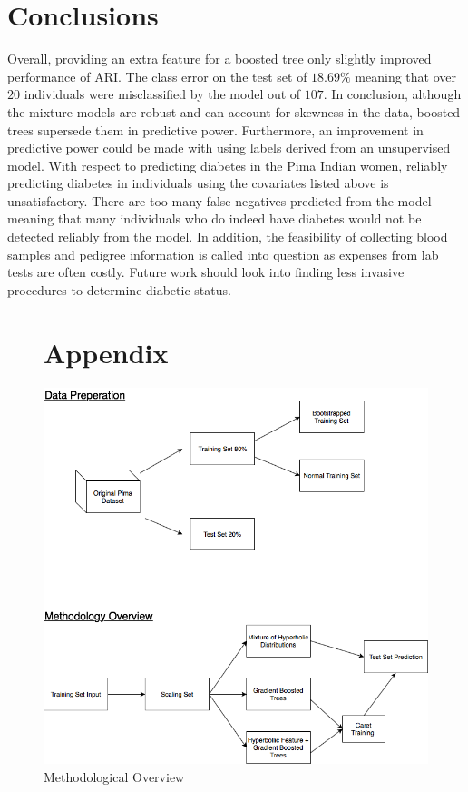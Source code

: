 \documentclass[11pt,letterpaper]{article}
\begin{document}
\section{Conclusions}
Overall, providing an extra feature for a boosted tree only slightly improved performance of ARI. The class error on the test set of  $18.69 \%$ meaning that over $20$ individuals were misclassified by the model out of $107$. In conclusion, although the mixture models are robust and can account for skewness in the data, boosted trees supersede them in predictive power. Furthermore, an improvement in predictive power could be made with using labels derived from an unsupervised model. With respect to predicting diabetes in the Pima Indian women, reliably predicting diabetes in individuals using the covariates listed above is unsatisfactory. There are too many false negatives predicted from the model meaning that many individuals who do indeed have diabetes would not be detected reliably from the model. In addition, the feasibility of collecting blood samples and pedigree information is called into question as expenses from lab tests are often costly. Future work should look into finding less invasive procedures to determine diabetic status.  



\begin{figure}
\section{Appendix}
\label{fig:overview}
\caption{Methodological Overview}
\centering
\vspace{20pt}
\includegraphics[scale=0.45]{MethodOverview}
\end{figure}


\newpage


 
\end{document}

